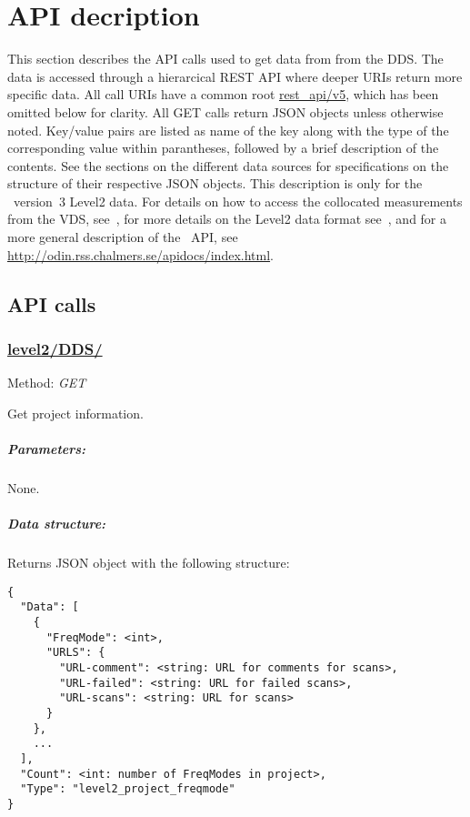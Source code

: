 \chapter{API decription}
\label{chapter:api}
This section describes the API calls used to get data from from the DDS.  The
data is accessed through a hierarcical REST API where deeper URIs return more
specific data.  All call URIs have a common root \url{rest_api/v5}, which
has been omitted below for clarity.  All GET calls return JSON objects unless
otherwise noted. Key/value pairs are listed as name of the key
along with the type of the corresponding value within parantheses, followed
by a brief description of the contents.  See the sections on the different
data sources for specifications on the structure of their respective JSON
objects. This description is only for the \smr~version~3 Level2 data. For
details on how to access the collocated measurements from the VDS,
see~\cite{VDS:2016}, for more details on the Level2 data format
see~\cite{iodd, atbdl2data}, and for a more general description of the \smr~API,
see \url{http://odin.rss.chalmers.se/apidocs/index.html}.


\section{API calls}
\subsection{\url{level2/DDS/}}
Method: \emph{GET}

Get project information.

\paragraph{Parameters:} None.

\paragraph{Data structure:}
Returns JSON object with the following structure:

\begin{lstlisting}[basicstyle=\footnotesize]
{
  "Data": [
    {
      "FreqMode": <int>,
      "URLS": {
        "URL-comment": <string: URL for comments for scans>,
        "URL-failed": <string: URL for failed scans>,
        "URL-scans": <string: URL for scans>
      }
    },
    ...
  ],
  "Count": <int: number of FreqModes in project>,
  "Type": "level2_project_freqmode"
}
\end{lstlisting}


